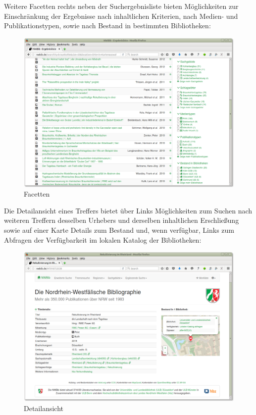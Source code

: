 \documentclass[a4paper,
fontsize=11pt,
oneside,
numbers=noperiodatend,
parskip=half-,
bibliography=totoc,
final
]{scrartcl}
\begin{document}
Weitere Facetten rechts neben der Suchergebnisliste bieten Möglichkeiten
zur Einschränkung der Ergebnisse nach inhaltlichen Kriterien, nach
Medien- und Publikationstypen, sowie nach Bestand in bestimmten
Bibliotheken:

\begin{figure}[htbp]
\centering
\includegraphics{img/nwbib-screenshot-facetten.png}
\caption{Facetten}
\end{figure}

Die Detailansicht eines Treffers bietet über Links Möglichkeiten zum
Suchen nach weiteren Treffern desselben Urhebers und derselben
inhaltlichen Erschließung sowie auf einer Karte Details zum Bestand und,
wenn verfügbar, Links zum Abfragen der Verfügbarkeit im lokalen Katalog
der Bibliotheken:

\begin{figure}[htbp]
\centering
\includegraphics{img/nwbib-screenshot-detailansicht.png}
\caption{Detailansicht}
\end{figure}
\end{document}
